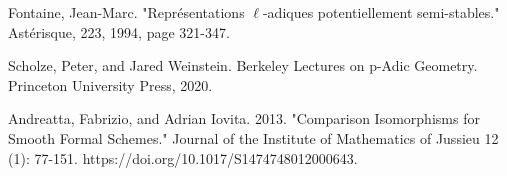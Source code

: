 \documentclass[12pt]{book}
\theoremstyle{definition}
\begin{document}
\begin{thebibliography}{}
 Fontaine, Jean-Marc. "Repr\'esentations $\ell$-adiques potentiellement semi-stables." Ast\'erisque, 223, 1994, page 321-347.

 Scholze, Peter, and Jared Weinstein. Berkeley Lectures on p-Adic Geometry. Princeton University Press, 2020.

 Andreatta, Fabrizio, and Adrian Iovita. 2013. "Comparison Isomorphisms for Smooth Formal Schemes." Journal of the Institute of Mathematics of Jussieu 12 (1): 77-151. https://doi.org/10.1017/S1474748012000643.



\end{thebibliography}
 






	
\end{document}
